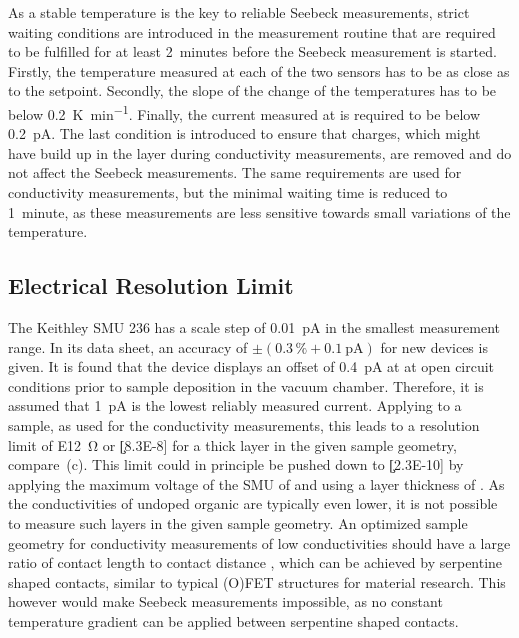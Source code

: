 As a stable temperature is the key to reliable Seebeck measurements, strict waiting conditions are introduced in the measurement routine that are required to be fulfilled for at least 2~minutes before the Seebeck measurement is started. Firstly, the temperature measured at each of the two sensors has to be as close as  to the setpoint. Secondly, the slope of the change of the temperatures has to be below \SI{0.2}{\kelvin\per\minute}. Finally, the current measured at \V[0] is required to be below \SI{0.2}{\pico\ampere}. The last condition is introduced to ensure that charges, which might have build up in the layer during conductivity measurements, are removed and do not affect the Seebeck measurements. The same requirements are used for conductivity measurements, but the minimal waiting time is reduced to 1~minute, as these measurements are less sensitive towards small variations of the temperature.

\subsection{Electrical Resolution Limit}\label{sec:ExpResLimit}%
The Keithley SMU 236 has a scale step of \SI{0.01}{\pico\ampere} in the smallest measurement range.
In its data sheet, an accuracy of $\pm(0.3\,\%+\SI{0.1}{\pico\ampere})$ for new devices is given. It is found that the device displays an offset of \SI{0.4}{\pico\ampere} at \V[10] at open circuit conditions prior to sample deposition in the vacuum chamber. Therefore, it is assumed that \SI{1}{\pico\ampere} is the lowest reliably measured current.
Applying \V[1] to a sample, as used for the conductivity measurements, this leads to a resolution limit of \SI{E12}{\ohm} or \c[8.3E-8] for a  thick layer in the given sample geometry, compare \,(c). This limit could in principle be pushed down to \c[2.3E-10] by applying the maximum voltage of the SMU of \V[110] and using a layer thickness of . As the conductivities of undoped organic \SCs are typically even lower, it is not possible to measure such layers in the given sample geometry. An optimized sample geometry for conductivity measurements of low conductivities should have a large ratio of contact length \lc to contact distance \dc, which can be achieved by serpentine shaped contacts, similar to typical (O)FET structures for material research. This however would make Seebeck measurements impossible, as no constant temperature gradient can be applied between serpentine shaped contacts.

